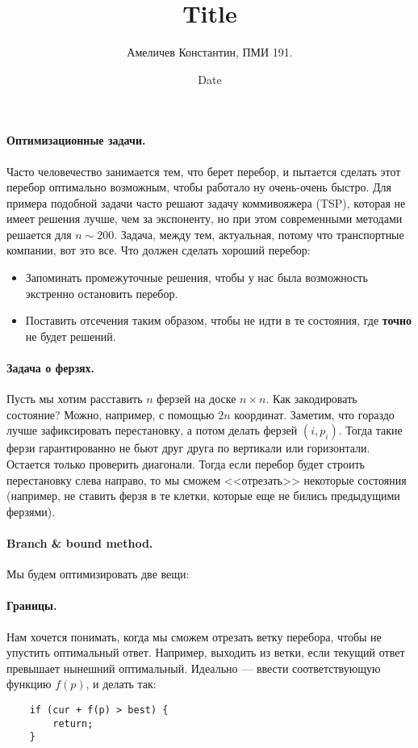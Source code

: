 \documentclass[12pt]{article}
\title{Title}
\author{Амеличев Константин, ПМИ 191.}
\date{Date}
\begin{document}
\paragraph{Оптимизационные задачи.} Часто человечество занимается тем, что берет перебор, и пытается сделать этот перебор оптимально возможным, чтобы работало ну очень-очень быстро. Для примера подобной задачи часто решают задачу коммивояжера (TSP), которая не имеет решения лучше, чем за экспоненту, но при этом современными методами решается для $n \sim 200$. Задача, между тем, актуальная, потому что транспортные компании, вот это все. Что должен сделать хороший перебор:
\begin{itemize}
    \item Запоминать промежуточные решения, чтобы у нас была возможность экстренно остановить перебор.
    \item Поставить отсечения таким образом, чтобы не идти в те состояния, где \textbf{точно} не будет решений.
\end{itemize}

\paragraph{Задача о ферзях.} Пусть мы хотим расставить $n$ ферзей на доске $n \times n$. Как закодировать состояние? Можно, например, с помощью $2n$ координат. Заметим, что гораздо лучше зафиксировать перестановку, а потом делать ферзей $(i, p_i)$. Тогда такие ферзи гарантированно не бьют друг друга по вертикали или горизонтали. Остается только проверить диагонали. Тогда если перебор будет строить перестановку слева направо, то мы сможем <<отрезать>> некоторые состояния (например, не ставить ферзя в те клетки, которые еще не бились предыдущими ферзями).

\paragraph{Branch \& bound method.}  Мы будем оптимизировать две вещи:

\paragraph{Границы.} Нам хочется понимать, когда мы сможем отрезать ветку перебора, чтобы не упустить оптимальный ответ. Например, выходить из ветки, если текущий ответ превышает нынешний оптимальный. Идеально --- ввести соответствующую функцию $f(p)$, и делать так:
\begin{verbatim}
    if (cur + f(p) > best) {
        return;
    }
\end{verbatim}
\end{document}
